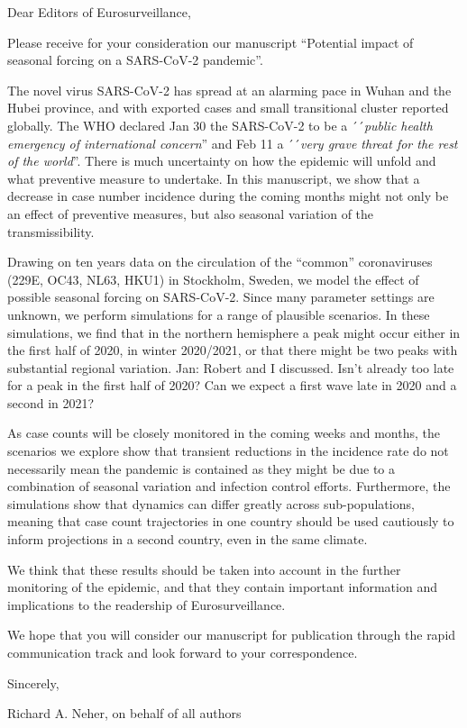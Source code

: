 \documentclass[rmp, eprint, superscriptaddress,floatfix]{revtex4-1}
\newcommand{\Jan}[1]{{\color{deepsaffron}Jan: #1}}
\begin{document}
Dear Editors of Eurosurveillance,

Please receive for your consideration our manuscript “Potential impact of seasonal forcing on a SARS-CoV-2 pandemic”. 

The novel virus SARS-CoV-2 has spread at an alarming pace in Wuhan and the Hubei province, and with exported cases and small transitional cluster reported globally. The WHO declared Jan 30 the SARS-CoV-2 to be a ´´\textit{public health emergency of international concern}” and Feb 11 a ´´\textit{very grave threat for the rest of the world}”. There is much uncertainty on how the epidemic will unfold and what preventive measure to undertake. In this manuscript, we show that a decrease in case number incidence during the coming months might not only be an effect of preventive measures, but also seasonal variation of the transmissibility.

Drawing on ten years data on the circulation of the “common” coronaviruses (229E, OC43, NL63, HKU1) in Stockholm, Sweden, we model the effect of possible seasonal forcing on SARS-CoV-2. Since many parameter settings are unknown, we perform simulations for a range of plausible scenarios. In these simulations, we find that in the northern hemisphere a peak might occur either in the first half of 2020, in winter 2020/2021, or that there might be two peaks with substantial regional variation.
\Jan{Robert and I discussed. Isn't already too late for a peak in the first half of 2020? Can we expect a first wave late in 2020 and a second in 2021?}

As case counts will be closely monitored in the coming weeks and months, the scenarios we explore show that transient reductions in the incidence rate do not necessarily mean the pandemic is contained as they might be due to a combination of seasonal variation and infection control efforts. Furthermore, the simulations show that dynamics can differ greatly across sub-populations, meaning that case count trajectories in one country should be used cautiously to inform projections in a second country, even in the same climate. 

We think that these results should be taken into account in the further monitoring of the epidemic, and that they contain important information and implications to the readership of Eurosurveillance. 

We hope that you will consider our manuscript for publication through the rapid communication track and look forward to
your correspondence.

Sincerely,

Richard A. Neher, on behalf of all authors
\end{document}
